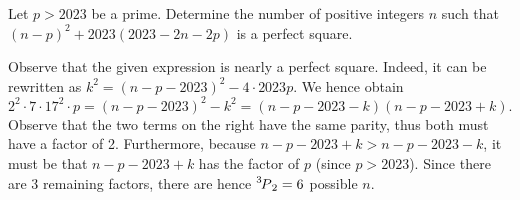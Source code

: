 \begin{question}[6]\label{A::2023-O-1-25}
    Let $p > 2023$ be a prime. Determine the number of positive integers $n$ such that $(n-p)^2 + 2023(2023 - 2n - 2p)$ is a perfect square.
\end{question}

Observe that the given expression is nearly a perfect square. Indeed, it can be rewritten as $k^2 = (n-p-2023)^2 - 4 \cdot 2023 p$. We hence obtain \[2^2 \cdot 7 \cdot 17^2 \cdot p = (n-p-2023)^2 - k^2 = (n-p-2023-k)(n-p-2023+k).\] Observe that the two terms on the right have the same parity, thus both must have a factor of 2. Furthermore, because $n-p-2023 + k > n-p-2023-k$, it must be that $n-p-2023+k$ has the factor of $p$ (since $p > 2023$). Since there are 3 remaining factors, there are hence $\prescript{3\mkern-2.5mu}{}P_{2} = 6$ possible $n$.